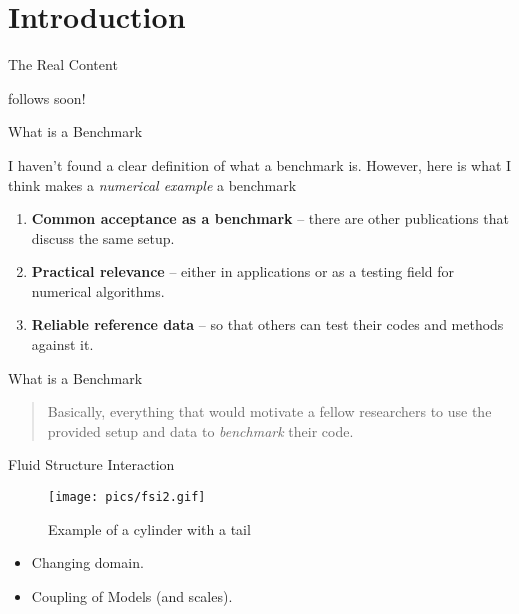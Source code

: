 \section{Introduction}\label{introduction}

\begin{frame}{The Real Content}

follows soon!

\end{frame}

\begin{frame}{What is a Benchmark}

I haven't found a clear definition of what a benchmark is. However, here
is what I think makes a \emph{numerical example} a benchmark

\begin{enumerate}
\def\labelenumi{\arabic{enumi}.}
\tightlist
\item
  \textbf{Common acceptance as a benchmark} -- there are other
  publications that discuss the same setup.
\item
  \textbf{Practical relevance} -- either in applications or as a testing
  field for numerical algorithms.
\item
  \textbf{Reliable reference data} -- so that others can test their
  codes and methods against it.
\end{enumerate}

\end{frame}

\begin{frame}{What is a Benchmark}

\begin{quote}
Basically, everything that would motivate a fellow researchers to use
the provided setup and data to \emph{benchmark} their code.
\end{quote}

\end{frame}

\begin{frame}{Fluid Structure Interaction}

\begin{figure}
\centering
\texttt{[image: pics/fsi2.gif]}
\caption{Example of a cylinder with a tail}
\end{figure}

\begin{itemize}
\tightlist
\item
  Changing domain.
\item
  Coupling of Models (and scales).
\end{itemize}

\end{frame}

